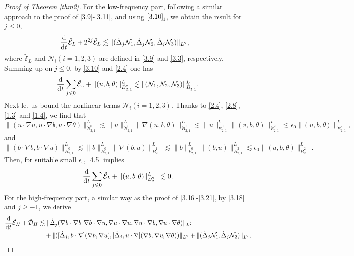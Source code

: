 \documentclass[reqno]{amsart}
\begin{document}
\begin{proof}[Proof of Theorem \ref{thm2}]
For the low-frequency part, following a similar approach to the proof of 
\eqref{3.9}-\eqref{3.11}, and using $\eqref{3.10}_1$, we obtain the result for 
$j\leqslant0$,
\begin{align*}
\frac{\rm d}{{\rm d}t}&\tilde{\mathcal{E}}_L+2^{2j}
\tilde{\mathcal{E}}_L\lesssim\|(\dot{\Delta}_j \mathcal{N}_1,\dot{\Delta}_j 
\mathcal{N}_2,\dot{\Delta}_j \mathcal{N}_3)\|_{L^2},
\end{align*}
where $\tilde{\mathcal{E}}_L$ and $\mathcal{N}_i (i=1,2,3)$ are defined in 
\eqref{3.9} and \eqref{3.3}, respectively. Summing up on $j\leqslant0$, 
by \eqref{3.10} and \eqref{2.4} one has
\begin{equation}\label{4.5}
 \frac{\rm d}{{\rm d}t}\sum_{j\leqslant0}\tilde{\mathcal{E}}_L+\|(u,b,\theta)
 \|_{\dot{B}^2_{2,1}}^L\lesssim\|( \mathcal{N}_1, \mathcal{N}_2, \mathcal{N}_3)
 \|_{\dot{B}^0_{2,1}}^L.
\end{equation}
Next let us bound the nonlinear terms $\mathcal{N}_i (i=1,2,3)$. 
Thanks to \eqref{2.4}, \eqref{2.8}, \eqref{1.3} and \eqref{1.4}, we find that
\[
\|(u\cdot\nabla u,u\cdot\nabla b,u\cdot\nabla \theta)\|_{\dot{B}^0_{2,1}}^L
\lesssim \|u\|_{{\dot{B}^0_{2,1}}}^L\|\nabla(u,b,\theta)\|_{{\dot{B}^1_{2,1}}}^L 
\lesssim \|u\|_{{\dot{B}^0_{2,1}}}^L\|(u,b,\theta)\|_{{\dot{B}^2_{2,1}}}^L
\lesssim \epsilon_0\|(u,b,\theta)\|_{{\dot{B}^2_{2,1}}}^L,
\]
and
\[
 \|(b\cdot\nabla b,b\cdot\nabla u)\|_{\dot{B}^0_{2,1}}^L
\lesssim \|b\|_{{\dot{B}^0_{2,1}}}^L\|\nabla(b,u)\|_{{\dot{B}^1_{2,1}}}^L 
\lesssim \|b\|_{{\dot{B}^0_{2,1}}}^L\|(b,u)\|_{{\dot{B}^2_{2,1}}}^L
\lesssim \epsilon_0\|(u,b,\theta)\|_{{\dot{B}^2_{2,1}}}^L.
\]
Then, for suitable small $\epsilon_0$, \eqref{4.5} implies
\begin{equation}\label{4.6}
 \frac{\rm d}{{\rm d}t}\sum_{j\leqslant0}\tilde{\mathcal{E}}_L+\|(u,b,\theta)
 \|_{\dot{B}^2_{2,1}}^L\lesssim 0.
\end{equation}
For the high-frequency part, a similar way as the proof of \eqref{3.16}-\eqref{3.21}, 
by \eqref{3.18} and $j\geqslant-1$, we derive
\begin{align*}
 \frac{\rm d}{{\rm d}t}\tilde{\mathcal{E}}_H+\tilde{\mathcal{D}}_H
&\lesssim\|\dot{\Delta}_j(\nabla b\cdot\nabla b,\nabla b\cdot\nabla u,
 \nabla u\cdot\nabla u,\nabla u\cdot\nabla b,\nabla u\cdot\nabla \theta)\|_{L^2}\\
&\quad +\|([\dot{\Delta}_j,b\cdot\nabla](\nabla b,\nabla u),[\dot{\Delta}_j,u\cdot\nabla](\nabla b,\nabla u,\nabla\theta))\|_{L^2}+\|(\dot{\Delta}_j \mathcal{N}_1,\dot{\Delta}_j \mathcal{N}_2)\|_{L^2},

\end{align*}
\end{proof}
\end{document}
